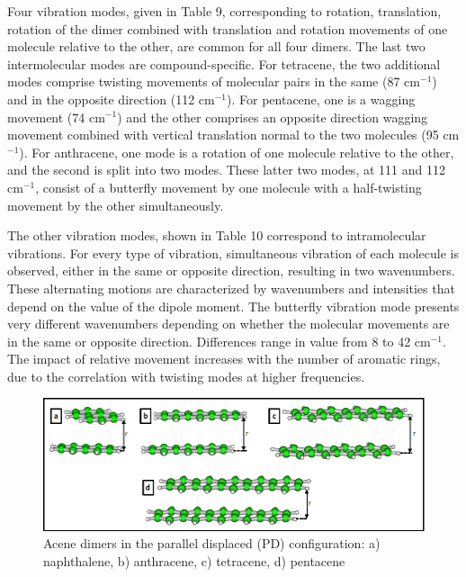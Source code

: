 Four vibration modes, given in Table 9, corresponding to rotation, translation, rotation of the dimer combined with translation and rotation movements of one molecule relative to the other, are common for all four dimers. The last two intermolecular modes are compound-specific. For tetracene, the two additional modes comprise twisting movements of molecular pairs in the same (87 cm$^{-1}$) and in the opposite direction (112 cm$^{-1}$). For pentacene, one is a wagging movement (74 cm$^{-1}$) and the other comprises an opposite direction wagging movement combined with vertical translation normal to the two molecules (95 cm$^{-1}$). For anthracene, one mode is a rotation of one molecule relative to the other, and the second is split into two modes. These latter two modes, at 111 and 112 cm$^{-1}$, consist of a butterfly movement by one molecule with a half-twisting movement by the other simultaneously.

The other vibration modes, shown in Table 10 correspond to intramolecular vibrations. For every type of vibration, simultaneous vibration of each molecule is observed, either in the same or opposite direction, resulting in two wavenumbers. These alternating motions are characterized by wavenumbers and intensities that depend on the value of the dipole moment. The butterfly vibration mode presents very different wavenumbers depending on whether the molecular movements are in the same or opposite direction. Differences range in value from 8 to 42 cm$^{-1}$. The impact of relative movement increases with the number of aromatic rings, due to the correlation with twisting modes at higher frequencies. 

\begin{figure}[h]
	\centering
	\includegraphics[scale=0.55]{image/acene-dimers}
	\caption[Acene dimers in the parallel displaced configuration]{Acene dimers in the parallel displaced (PD) configuration: a) naphthalene, b) anthracene, c) tetracene, d) pentacene}
\end{figure}

